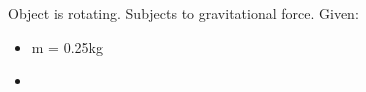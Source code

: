 

Object is rotating. Subjects to gravitational force.
Given: 

\begin{itemize}
    \item m = 0.25kg
    \item 
\end{itemize}
